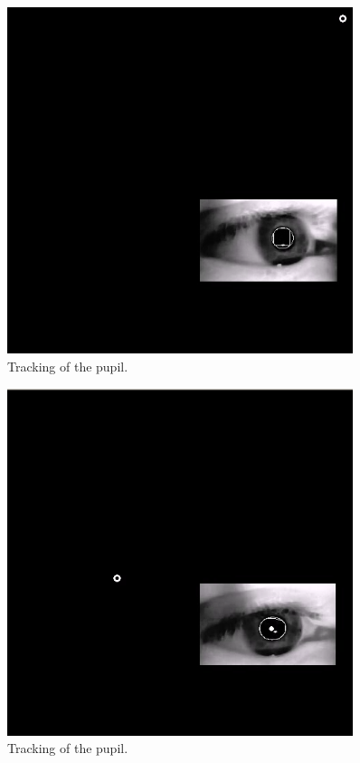 \begin{figure}[H]
  \centering
  \includegraphics[width=0.9\textwidth]{fin_calibration.png}
  \caption{Tracking of the pupil.}\label{fig:pupil1}
\end{figure}

\begin{figure}[H]
  \centering
  \includegraphics[width=0.9\textwidth]{fin_mapping.png}
  \caption{Tracking of the pupil.}\label{fig:pupil1}
\end{figure}

